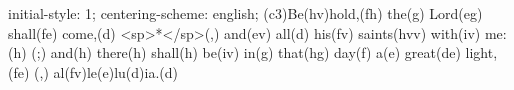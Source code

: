 initial-style: 1;
centering-scheme: english;
(c3)Be(hv)hold,(fh) the(g) Lord(eg) shall(fe) come,(d) <sp>*</sp>(,) and(ev) all(d) his(fv) saints(hvv) with(iv) me:(h) (;) and(h) there(h) shall(h) be(iv) in(g) that(hg) day(f) a(e) great(de) light,(fe) (,) al(fv)le(e)lu(d)ia.(d)
